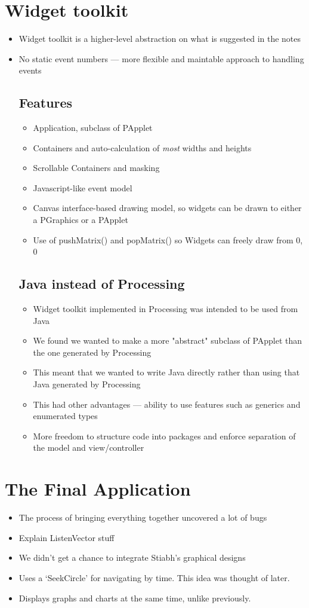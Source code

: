 \section{Widget toolkit}
\begin{itemize}
\item Widget toolkit is a higher-level abstraction on what is suggested in the notes
\item No static event numbers --- more flexible and maintable approach to handling events
\subsection{Features}
\begin{itemize}
\item Application, subclass of PApplet
\item Containers and auto-calculation of \textit{most} widths and heights
\item Scrollable Containers and masking
\item Javascript-like event model
\item Canvas interface-based drawing model, so widgets can be drawn to either a PGraphics or a PApplet
\item Use of pushMatrix() and popMatrix() so Widgets can freely draw from 0, 0
\end{itemize}
\subsection{Java instead of Processing}
\begin{itemize}
\item Widget toolkit implemented in Processing was intended to be used from Java
\item We found we wanted to make a more "abstract" subclass of PApplet than the one generated by Processing
\item This meant that we wanted to write Java directly rather than using that Java generated by Processing
\item This had other advantages --- ability to use features such as generics and enumerated types
\item More freedom to structure code into packages and enforce separation of the model and view/controller
\end{itemize}
\end{itemize}

\section{The Final Application}
\begin{itemize}
\item The process of bringing everything together uncovered a lot of bugs
\item Explain ListenVector stuff
\item We didn't get a chance to integrate Stiabh's graphical designs
\item Uses a `SeekCircle' for navigating by time. This idea was thought of later.
\item Displays graphs and charts at the same time, unlike previously.
\end{itemize}

